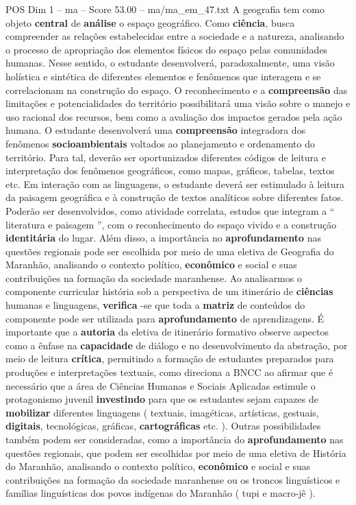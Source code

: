 \begin{textsample}{POS Dim 1 – ma – Score 53.00 – ma/ma\_em\_47.txt}
A geografia tem como objeto \textbf{central} de \textbf{análise} o espaço geográfico.
Como \textbf{ciência}, busca compreender as relações estabelecidas entre a sociedade e a natureza, analisando o processo de apropriação dos elementos físicos do espaço pelas comunidades humanas.
Nesse sentido, o estudante desenvolverá, paradoxalmente, uma visão holística e sintética de diferentes elementos e fenômenos que interagem e se correlacionam na construção do espaço.
O reconhecimento e a \textbf{compreensão} das limitações e potencialidades do território possibilitará uma visão sobre o manejo e uso racional dos recursos, bem como a avaliação dos impactos gerados pela ação humana.
O estudante desenvolverá uma \textbf{compreensão} integradora dos fenômenos \textbf{socioambientais} voltados ao planejamento e ordenamento do território.
Para tal, deverão ser oportunizados diferentes códigos de leitura e interpretação dos fenômenos geográficos, como mapas, gráficos, tabelas, textos etc.
Em interação com as linguagens, o estudante deverá ser estimulado à leitura da paisagem geográfica e à construção de textos analíticos sobre diferentes fatos.
Poderão ser desenvolvidos, como atividade correlata, estudos que integram a “ literatura e paisagem ”, com o reconhecimento do espaço vivido e a construção \textbf{identitária} do lugar.
Além disso, a importância no \textbf{aprofundamento} nas questões regionais pode ser escolhida por meio de uma eletiva de Geografia do Maranhão, analisando o contexto político, \textbf{econômico} e social e suas contribuições na formação da sociedade maranhense.
Ao analisarmos o componente curricular história sob a perspectiva de um itinerário de \textbf{ciências} humanas e linguagens, \textbf{verifica} -se que toda a \textbf{matriz} de conteúdos do componente pode ser utilizada para \textbf{aprofundamento} de aprendizagens.
É importante que a \textbf{autoria} da eletiva de itinerário formativo observe aspectos como a ênfase na \textbf{capacidade} de diálogo e no desenvolvimento da abstração, por meio de leitura \textbf{crítica}, permitindo a formação de estudantes preparados para produções e interpretações textuais, como direciona a BNCC ao afirmar que é necessário que a área de Ciências Humanas e Sociais Aplicadas estimule o protagonismo juvenil \textbf{investindo} para que os estudantes sejam capazes de \textbf{mobilizar} diferentes linguagens ( textuais, imagéticas, artísticas, gestuais, \textbf{digitais}, tecnológicas, gráficas, \textbf{cartográficas} etc. ).
Outras possibilidades também podem ser consideradas, como a importância do \textbf{aprofundamento} nas questões regionais, que podem ser escolhidas por meio de uma eletiva de História do Maranhão, analisando o contexto político, \textbf{econômico} e social e suas contribuições na formação da sociedade maranhense ou os troncos linguísticos e famílias linguísticas dos povos indígenas do Maranhão ( tupi e macro-jê ).

\end{textsample}
